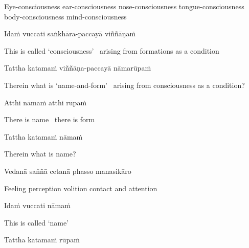 \begin{english-hang}
  Eye-consciousness ear-consciousness nose-consciousness tongue-consciousness body-consciousness mind-consciousness
\end{english-hang}

Idaṁ vuccati saṅkhāra-paccayā viññāṇaṁ

\begin{english}
  This is called `consciousness' \breathmark\ arising from formations as a condition
\end{english}

Tattha katamaṁ viññāṇa-paccayā nāmarūpaṁ

\begin{english-hang}
  Therein what is `name-and-form' \breathmark\ arising from consciousness as a condition?
\end{english-hang}

Atthi nāmaṁ atthi rūpaṁ

\begin{english}
  There is name \breathmark\ there is form
\end{english}

Tattha katamaṁ nāmaṁ

\begin{english}
  Therein what is name?
\end{english}

Vedanā saññā cetanā phasso manasikāro\makeatletter\hyperlink{endnote80-appendix}\makeatother

\begin{english}
  Feeling perception volition contact and attention
\end{english}

Idaṁ vuccati nāmaṁ

\begin{english}
  This is called `name'
\end{english}

Tattha katamaṁ rūpaṁ

